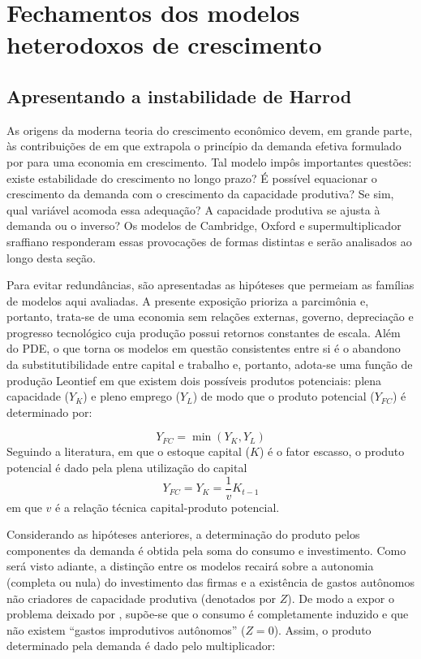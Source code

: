 \section{Fechamentos dos modelos heterodoxos de crescimento}\label{SecFechamentos}
\subsection{Apresentando a instabilidade de Harrod}
\label{SecHarrod}

As origens da moderna teoria do crescimento econômico devem, em grande parte, às contribuições de \textcite{harrod_essay_1939} em que extrapola o princípio da demanda efetiva formulado por \textcite{keynes_general_1936} para uma economia em crescimento. Tal modelo impôs importantes questões: existe estabilidade do crescimento no longo prazo? É possível equacionar o crescimento da demanda com o crescimento da capacidade produtiva? Se sim, qual variável acomoda essa adequação? A capacidade produtiva se ajusta à demanda ou o inverso? Os modelos de Cambridge, Oxford e supermultiplicador sraffiano responderam essas provocações de formas distintas e serão analisados ao longo desta seção.

Para evitar redundâncias, são apresentadas as hipóteses que permeiam as famílias de modelos aqui avaliadas. 
A presente exposição prioriza a parcimônia e, portanto, trata-se de uma economia sem relações externas, governo, depreciação e progresso tecnológico cuja produção possui retornos constantes de escala. Além do PDE, o que torna os modelos em questão consistentes entre si é o abandono da substitutibilidade entre capital e trabalho e, portanto, adota-se uma função de produção Leontief em que existem dois possíveis produtos potenciais: plena capacidade ($Y_K$) e pleno emprego ($Y_L$) de modo que o produto potencial ($Y_{FC}$) é determinado por:

\begin{equation}
    Y_{FC} = \min (Y_K, Y_L)
\end{equation}
Seguindo a literatura, em que o estoque capital ($K$) é o fator escasso, o produto potencial é dado pela plena utilização do capital
\begin{equation}
\label{Oferta}
    Y_{FC} = Y_K = \frac{1}{v}K_{t-1}
\end{equation}
em que $v$ é a relação técnica capital-produto potencial. 


Considerando as hipóteses anteriores, a determinação do produto pelos componentes da demanda é obtida pela soma do consumo e investimento. Como será visto adiante, a distinção entre os modelos recairá sobre a autonomia (completa ou nula) do investimento das firmas e a existência de gastos autônomos não criadores de capacidade produtiva (denotados por $Z$). De modo a expor o problema deixado por \textcite{harrod_essay_1939}, supõe-se que o consumo é completamente induzido e que não existem ``gastos improdutivos autônomos'' ($Z=0$). Assim, o produto determinado pela demanda é dado pelo multiplicador:

